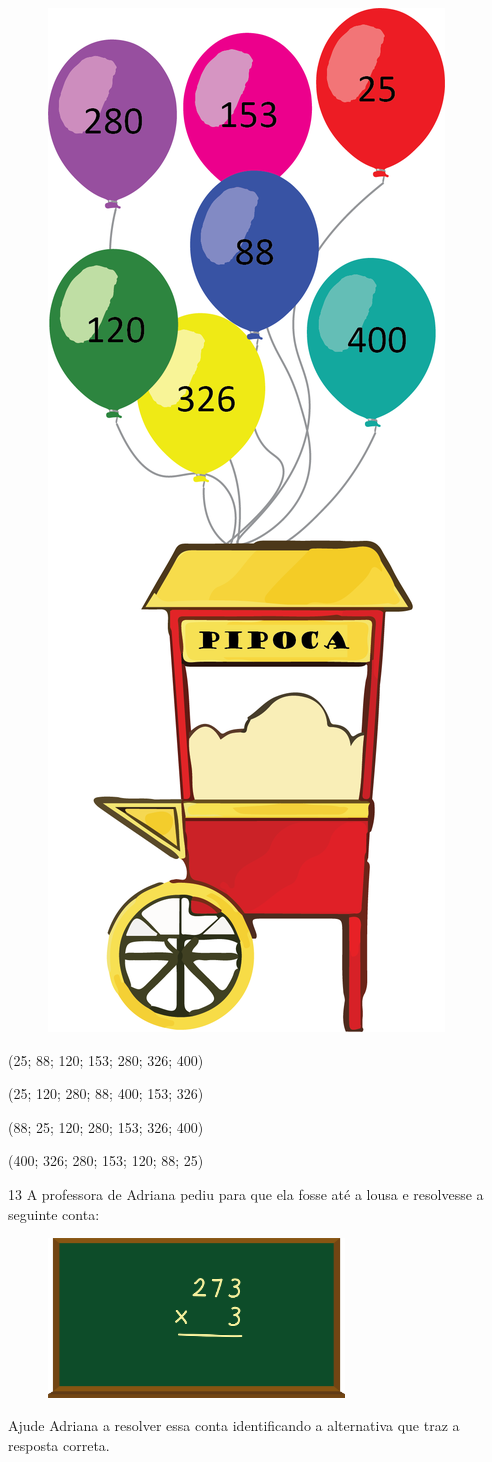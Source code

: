 \begin{figure}[htpb!]
\centering
\includegraphics[width=.3\textwidth]{./media/image98.png}
\end{figure}

\begin{escolha}
\item
  (25; 88; 120; 153; 280; 326; 400)
\item
  (25; 120; 280; 88; 400; 153; 326)
\item
  (88; 25; 120; 280; 153; 326; 400)
\item
  (400; 326; 280; 153; 120; 88; 25)
\end{escolha}

\pagebreak

\num{13} A professora de Adriana pediu para que ela fosse até a lousa e resolvesse a seguinte conta:

\begin{figure}[htpb!]
\centering
\includegraphics[width=0.7\textwidth]{./media/image99.png}
\end{figure}

Ajude Adriana a resolver essa conta identificando a alternativa que traz a resposta correta.

